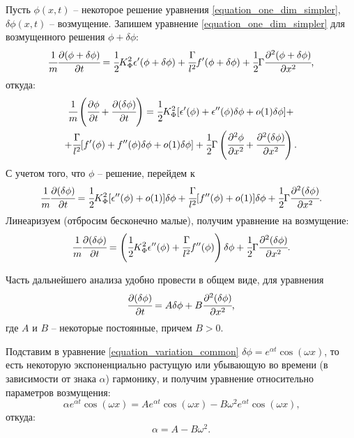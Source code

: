 \documentclass[a4paper,12pt]{article}
\theoremstyle{plain}
\theoremstyle{definition}
\begin{document}
Пусть $\phi(x, t)$ -- некоторое решение уравнения \eqref{equation_one_dim_simpler}, $\delta \phi(x, t)$ -- возмущение. Запишем уравнение \eqref{equation_one_dim_simpler} для возмущенного решения $\phi + \delta \phi$:
$$\cfrac{1}{m} \cfrac{\partial (\phi + \delta \phi)}{\partial t} = \cfrac{1}{2} K_\Phi^2 \epsilon'(\phi + \delta \phi) + \cfrac{\Gamma}{l^2} f'(\phi + \delta \phi) + \cfrac{1}{2} \Gamma \cfrac{\partial^2 (\phi + \delta \phi)}{\partial x^2} \text{,}$$
откуда:
\begin{multline*}
    \cfrac{1}{m} \left( \cfrac{\partial \phi}{\partial t} + \cfrac{\partial (\delta \phi)}{\partial t} \right) = \cfrac{1}{2} K_\Phi^2 [\epsilon'(\phi) + \epsilon''(\phi) \delta \phi + o(1) \delta \phi] + \\ + \cfrac{\Gamma}{l^2} [f'(\phi) + f''(\phi) \delta \phi + o(1) \delta \phi] + \cfrac{1}{2} \Gamma \left( \cfrac{\partial^2 \phi}{\partial x^2} + \cfrac{\partial^2 (\delta \phi)}{\partial x^2} \right) \text{.}
\end{multline*}
С учетом того, что $\phi$ -- решение, перейдем к
$$\cfrac{1}{m} \cfrac{\partial (\delta \phi)}{\partial t} = \cfrac{1}{2} K_\Phi^2 [\epsilon''(\phi) + o(1)] \delta \phi + \cfrac{\Gamma}{l^2} [f''(\phi) + o(1)] \delta \phi + \cfrac{1}{2} \Gamma \cfrac{\partial^2 (\delta \phi)}{\partial x^2} \text{.}$$
Линеаризуем (отбросим бесконечно малые), получим уравнение на возмущение:
\begin{equation}
    \cfrac{1}{m} \cfrac{\partial (\delta \phi)}{\partial t} = \left(\cfrac{1}{2} K_\Phi^2 \epsilon''(\phi) + \cfrac{\Gamma}{l^2} f''(\phi) \right) \delta \phi + \cfrac{1}{2} \Gamma \cfrac{\partial^2 (\delta \phi)}{\partial x^2} \text{.}
    \label{equation_variation}
\end{equation}

Часть дальнейшего анализа удобно провести в общем виде, для уравнения
\begin{equation}
    \cfrac{\partial (\delta \phi)}{\partial t} = A \delta \phi + B \cfrac{\partial^2 (\delta \phi)}{\partial x^2} \text{,}
    \label{equation_variation_common}
\end{equation}
где $A$ и $B$ -- некоторые постоянные, причем $B > 0$.

Подставим в уравнение \eqref{equation_variation_common} $\delta \phi = e^{\alpha t} \cos(\omega x)$, то есть некоторую экспоненциально растущую или убывающую во времени (в зависимости от знака $\alpha$) гармонику, и получим уравнение относительно параметров возмущения:
$$\alpha e^{\alpha t} \cos(\omega x) = A e^{\alpha t} \cos(\omega x) - B \omega^2 e^{\alpha t} \cos(\omega x) \text{,}$$
откуда:
\begin{equation}
    \alpha = A - B \omega^2 \text{.}
    \label{equation_exponent_coefficient}
\end{equation}
\end{document}
